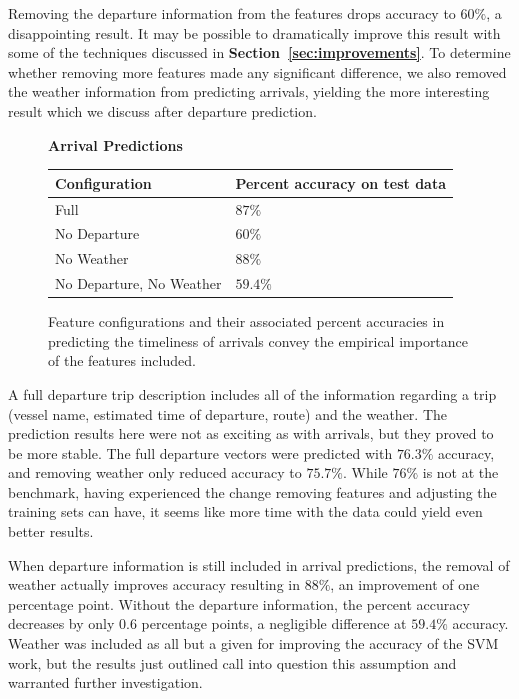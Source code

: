 \documentclass[11pt]{article} %
\begin{document}
Removing the departure information from the features drops accuracy to $60\%$, 
a disappointing result. It may be possible to dramatically improve this result with
some of the techniques discussed in \textbf{Section~\ref{sec:improvements}}.
To determine whether removing more features made any significant difference, we
also removed the weather information from predicting arrivals, yielding 
the more interesting result which we discuss after departure prediction.

\begin{figure}
    \centering
    \textbf{Arrival Predictions}

    \begin{tabular}{ll}
        Configuration & Percent accuracy on test data\\
        \hline
        Full          & $87\%$\\
        No Departure  & $60\%$\\
        No Weather    & $88\%$\\
        No Departure, No Weather  & $59.4\%$\\
    \end{tabular}
    \caption{Feature configurations and their associated percent accuracies in
         predicting the timeliness of arrivals convey the empirical importance of 
         the features included.}
    \label{fig:second_run_data_arrivals}
\end{figure}

A full departure trip description includes all of the information regarding a trip
(vessel name, estimated time of departure, route) and the weather. 
The prediction results here were not
as exciting as with arrivals, but they proved to be more stable. The full 
departure vectors were predicted with $76.3\%$ accuracy, and removing weather
only reduced accuracy to $75.7\%$. While $76\%$ is not at the benchmark, having
experienced the change removing features and adjusting the training sets can have,
it seems like more time with the data could yield even better results.

When departure information is still included in arrival predictions, the removal of 
weather actually improves accuracy resulting in $88\%$, an improvement of one
percentage point. Without the departure information, the percent accuracy decreases
by only $0.6$ percentage points, a negligible difference at $59.4\%$ accuracy. 
Weather was included as all but a given for improving the accuracy of the SVM
work, but the results just outlined call into question this assumption and 
warranted further investigation.
\end{document}
